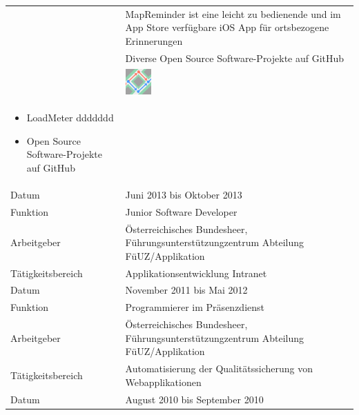 \begin{longtable}{p{}|p{}}

	\begin{tabular}{m{0.4\textwidth} m{0.02\textwidth} }
	\begin{itemize}[nosep,leftmargin=1em]
		\item MapReminder \newline
		MapReminder ist eine leicht zu bedienende und im App Store verfügbare iOS App für ortsbezogene Erinnerungen
	\end{itemize}
	& \includegraphics[height=1.0cm]{images/MCTS-Icon-1024} \\
	\begin{itemize}[nosep,leftmargin=1em]
		\item LoadMeter \newline
		ddddddd
	\end{itemize}
	\begin{itemize}[nosep,leftmargin=1em]
		\item Open Source Software-Projekte auf GitHub \newline
	\end{itemize}
	\end{tabular} \\
	\bottomrule
	Datum & Juni 2013 bis Oktober 2013 \\
	Funktion & Junior Software Developer \\
	Arbeitgeber & Österreichisches Bundesheer, Führungsunterstützungzentrum Abteilung FüUZ/Applikation \\
	Tätigkeitsbereich & Applikationsentwicklung Intranet \\
	\bottomrule
	\newpage
	Datum & November 2011 bis Mai 2012 \\
	Funktion & Programmierer im Präsenzdienst \\
	Arbeitgeber & Österreichisches Bundesheer, Führungsunterstützungzentrum Abteilung FüUZ/Applikation \\
	Tätigkeitsbereich & Automatisierung der Qualitätssicherung von Webapplikationen \\ \bottomrule
	Datum & August 2010 bis September 2010 \\

\end{longtable}
